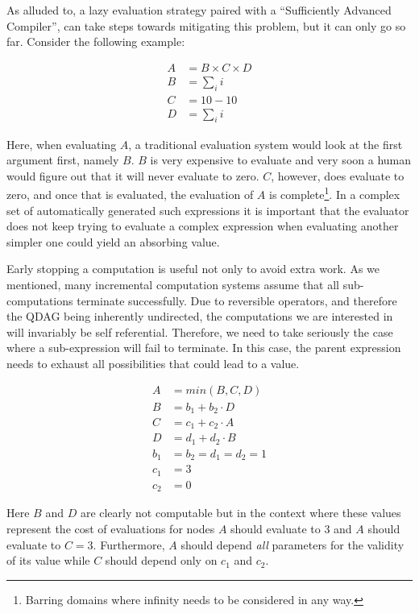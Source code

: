 As alluded to, a lazy evaluation strategy paired with a ``Sufficiently
Advanced Compiler'', can take steps towards mitigating this problem,
but it can only go so far. Consider the following example:

\begin{align*}
A &= B \times C \times D \\
B &= \sum_i{i} \\
C &= 10 - 10 \\
D &= \sum_i{i}
\end{align*}

Here, when evaluating \(A\), a traditional evaluation system would
look at the first argument first, namely \(B\). \(B\) is very
expensive to evaluate and very soon a human would figure out that it
will never evaluate to zero. \(C\), however, does evaluate to zero,
and once that is evaluated, the evaluation of \(A\) is
complete\footnote{Barring domains where infinity needs to be
  considered in any way.}. In a complex set of automatically generated
such expressions it is important that the evaluator does not keep
trying to evaluate a complex expression when evaluating another
simpler one could yield an absorbing value.

Early stopping a computation is useful not only to avoid extra
work. As we mentioned, many incremental computation systems assume
that all sub-computations terminate successfully. Due to reversible
operators, and therefore the QDAG being inherently undirected, the
computations we are interested in will invariably be self
referential. Therefore, we need to take seriously the case where a
sub-expression will fail to terminate. In this case, the parent
expression needs to exhaust all possibilities that could lead to a
value.

\begin{align*}
A &= min(B, C, D) \\
B &= b_1 + b_2 \cdot D \\
C &= c_1 + c_2 \cdot A \\
D &= d_1 + d_2 \cdot B \\
b_1 &= b_2 = d_1 = d_2 = 1 \\
c_1 &= 3 \\
c_2 &= 0
\end{align*}

Here \(B\) and \(D\) are clearly not computable but in the context
where these values represent the cost of evaluations for nodes \(A\)
should evaluate to 3 and \(A\) should evaluate to \(C =
3\). Furthermore, \(A\) should depend \emph{all} parameters for the
validity of its value while \(C\) should depend only on \(c_1\) and
\(c_2\).


